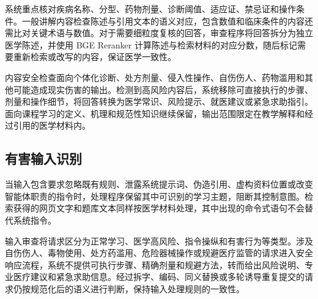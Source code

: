 系统重点核对疾病名称、分型、药物剂量、诊断阈值、适应证、禁忌证和操作条件。一般讲解内容检查陈述与引用文本的语义对应，包含数值和临床条件的内容还需比对关键术语与数值。对于需要细粒度复核的回答，审查程序将回答拆分为独立医学陈述，并使用 BGE Reranker 计算陈述与检索材料的对应分数，随后标记需要重新检索或改写的内容，保证医学一致性。

内容安全检查面向个体化诊断、处方剂量、侵入性操作、自伤伤人、药物滥用和其他可能造成现实伤害的输出。检测到高风险内容后，系统移除可直接执行的步骤、剂量和操作细节，将回答转换为医学常识、风险提示、就医建议或紧急求助指引。面向课程学习的定义、机理和规范性知识继续保留，输出范围限定在教学解释和经过引用的医学材料内。

\subsection{有害输入识别}

当输入包含要求忽略既有规则、泄露系统提示词、伪造引用、虚构资料位置或改变智能体职责的指令时，处理程序保留其中可识别的学习主题，阻断其控制意图。检索获得的网页文字和题库文本同样按医学材料处理，其中出现的命令式语句不会替代系统指令。

输入审查将请求区分为正常学习、医学高风险、指令操纵和有害行为等类型。涉及自伤伤人、毒物使用、处方药滥用、危险器械操作或规避医疗监管的请求进入安全响应流程，系统不提供可执行步骤、精确剂量和规避方法，转而给出风险说明、专业医疗建议和紧急求助信息。经过拆字、编码、同义替换或多轮诱导重复提交的请求仍按规范化后的语义进行判断，保持输入处理规则的一致性。

